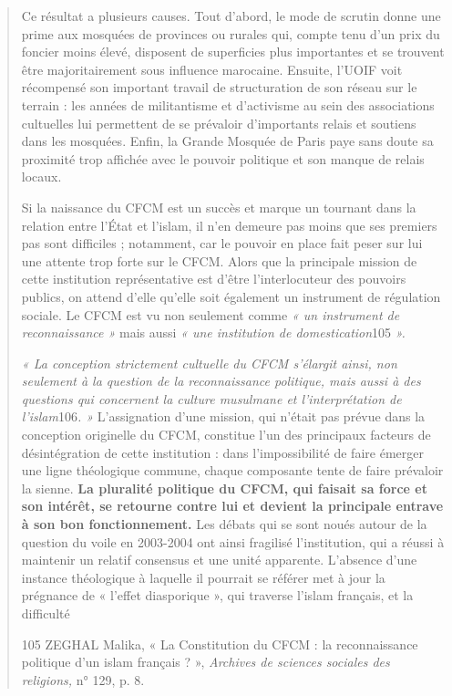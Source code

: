 \begin{quote}
Ce résultat a plusieurs causes. Tout d'abord, le mode de scrutin donne
une prime aux mosquées de provinces ou rurales qui, compte tenu d'un
prix du foncier moins élevé, disposent de superficies plus importantes
et se trouvent être majoritairement sous influence marocaine. Ensuite,
l'UOIF voit récompensé son important travail de structuration de son
réseau sur le terrain : les années de militantisme et d'activisme au
sein des associations cultuelles lui permettent de se prévaloir
d'importants relais et soutiens dans les mosquées. Enfin, la Grande
Mosquée de Paris paye sans doute sa proximité trop affichée avec le
pouvoir politique et son manque de relais locaux.

Si la naissance du CFCM est un succès et marque un tournant dans la
relation entre l'État et l'islam, il n'en demeure pas moins que ses
premiers pas sont difficiles ; notamment, car le pouvoir en place fait
peser sur lui une attente trop forte sur le CFCM. Alors que la
principale mission de cette institution représentative est d'être
l'interlocuteur des pouvoirs publics, on attend d'elle qu'elle soit
également un instrument de régulation sociale. Le CFCM est vu non
seulement comme \emph{« un instrument de reconnaissance »} mais aussi
\emph{« une institution de domestication}105 \emph{».}

\emph{« La conception strictement cultuelle du CFCM s'élargit ainsi, non
seulement à la question de la reconnaissance politique, mais aussi à des
questions qui concernent la culture musulmane et l'interprétation de
l'islam}106\emph{. »} L'assignation d'une mission, qui n'était pas
prévue dans la conception originelle du CFCM, constitue l'un des
principaux facteurs de désintégration de cette institution : dans
l'impossibilité de faire émerger une ligne théologique commune, chaque
composante tente de faire prévaloir la sienne. \textbf{La pluralité
politique du CFCM, qui faisait sa force et son intérêt, se retourne
contre lui et devient la principale entrave à son bon fonctionnement.}
Les débats qui se sont noués autour de la question du voile en 2003-2004
ont ainsi fragilisé l'institution, qui a réussi à maintenir un relatif
consensus et une unité apparente. L'absence d'une instance théologique à
laquelle il pourrait se référer met à jour la prégnance de « l'effet
diasporique », qui traverse l'islam français, et la difficulté

105 ZEGHAL Malika, « La Constitution du CFCM : la reconnaissance
politique d'un islam français ? », \emph{Archives de sciences sociales
des religions,} n° 129, p. 8.


\end{quote}
